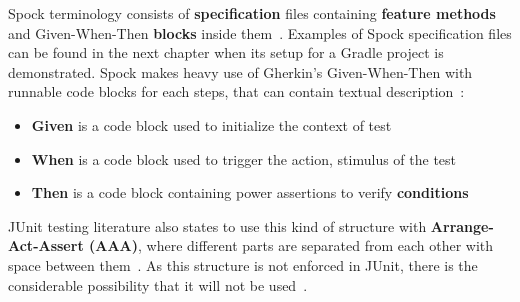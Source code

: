     Spock terminology consists of \textbf{specification} files containing \textbf{feature methods} and Given-When-Then
    \textbf{blocks} inside them~\cite{spock}. Examples of Spock specification files can be found in the next chapter
    when its setup for a Gradle project is demonstrated.
    Spock makes heavy use of Gherkin's Given-When-Then with runnable code blocks for each steps, that can contain textual
    description~\cite{kapelonis2016java}:
    \begin{itemize}
    \item \textbf{Given} is a code block used to initialize the context of test
    \item \textbf{When} is a code block used to trigger the action, stimulus of the test
    \item \textbf{Then} is a code block containing power assertions to verify \textbf{conditions}
    \end{itemize}
    JUnit testing literature also states to use this kind of structure with \textbf{Arrange-Act-Assert (AAA)},
    where different parts are separated from each other with space between them~\cite{langr2015pragmatic}.
    As this structure is not enforced in JUnit, there is the considerable possibility that it will not be used~\cite{kapelonis2016java}.


